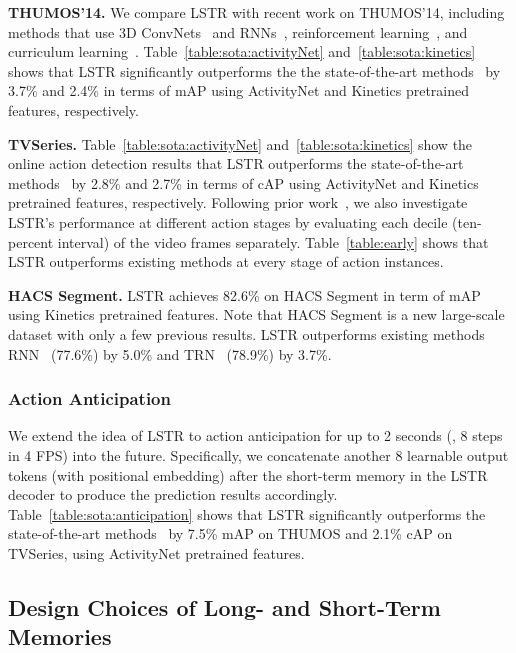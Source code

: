 \textbf{THUMOS'14.}
We compare LSTR with recent work on THUMOS'14, including methods that use 3D ConvNets~\cite{shou2017cdc} and RNNs~\cite{xu2017end,eun2020learning,gao2020woad}, reinforcement learning~\cite{gao2017red}, and curriculum learning~\cite{zhao2020privileged}.
Table~\ref{table:sota:activityNet} and~\ref{table:sota:kinetics} shows that LSTR significantly outperforms the the state-of-the-art methods~\cite{wu2019long,gao2020woad} by 3.7\% and 2.4\% in terms of mAP using ActivityNet and Kinetics pretrained features, respectively.

\textbf{TVSeries.}
Table~\ref{table:sota:activityNet} and~\ref{table:sota:kinetics} show the online action detection results that LSTR outperforms the state-of-the-art methods~\cite{eun2021temporal,zhao2020privileged} by 2.8\% and 2.7\% in terms of cAP using ActivityNet and Kinetics pretrained features, respectively.
Following prior work~\cite{de2016online}, we also investigate LSTR's performance at different action stages by evaluating each decile (ten-percent interval) of the video frames separately.
Table~\ref{table:early} shows that LSTR outperforms existing methods at every stage of action instances.

\textbf{HACS Segment.}
LSTR achieves 82.6\% on HACS Segment in term of mAP using Kinetics pretrained features.
Note that HACS Segment is a new large-scale dataset with only a few previous results.
LSTR outperforms existing methods RNN~\cite{hochreiter1997long} (77.6\%) by 5.0\% and TRN~\cite{xu2019temporal} (78.9\%) by 3.7\%. 

\vspace{-1mm}
\subsubsection{Action Anticipation}
\vspace{-1mm}

We extend the idea of LSTR to action anticipation for up to 2 seconds (\ie, 8 steps in 4 FPS) into the future.
Specifically, we concatenate another 8 learnable output tokens (with positional embedding) after the short-term memory in the LSTR decoder to produce the prediction results accordingly.
Table~\ref{table:sota:anticipation} shows that LSTR significantly outperforms the state-of-the-art methods~\cite{xu2019temporal,qu2020lap} by 7.5\% mAP on THUMOS and 2.1\% cAP on TVSeries, using ActivityNet pretrained features.

\vspace{-1mm}
\subsection{Design Choices of Long- and Short-Term Memories}
\label{exp:memory}
\vspace{-2mm}

